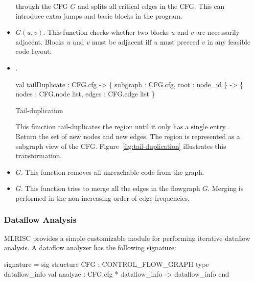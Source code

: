 \begin{itemize}
        through the CFG $G$ and splits
      all critical edges in the CFG.
      This can introduce extra jumps and basic blocks in the program.
  \item  {} $G (u,v)$.   This function
      checks whether two blocks $u$ and $v$ are necessarily adjacent.
      Blocks $u$ and $v$ must be adjacent iff $u$ must preceed $v$
      in any feasible code layout.
  \item  {}.  
   \begin{SML}
    val tailDuplicate : CFG.cfg -> \{ subgraph : CFG.cfg, root : node_id \} 
                                -> \{ nodes : CFG.node list, 
                                     edges : CFG.edge list \} 
   \end{SML}
\begin{Figure}
\begin{boxit}
\end{boxit}
\label{fig:tail-duplication} 
\caption{Tail-duplication}
\end{Figure}

      This function tail-duplicates the region 
      until it only has a single entry .
      Return the set of new nodes and new edges.  
      The region is represented as a subgraph view of the CFG.
      Figure~\ref{fig:tail-duplication} illustrates 
      this transformation.

  \item  {} $G$. This function
          removes all unreachable code  from the graph.
  \item  {} $G$.  This function tries to merge all
         the edges in the flowgraph $G$.  Merging is performed in the
         non-increasing order of edge frequencies. 
\end{itemize}

\subsubsection{Dataflow Analysis}
MLRISC provides a simple customizable module for performing
iterative dataflow analysis.   A dataflow analyzer
has the following signature:

\begin{SML}
 signature  = sig
   structure CFG : CONTROL_FLOW_GRAPH
   type dataflow_info
   val analyze : CFG.cfg * dataflow_info -> dataflow_info
 end
\end{SML}

